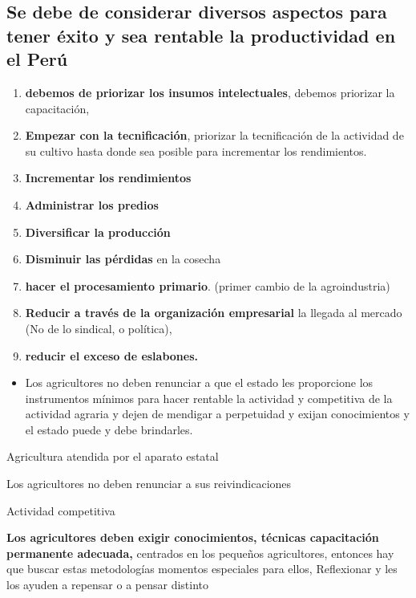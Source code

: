 \documentclass[
  letterpaper,
  DIV=11,
  numbers=noendperiod]{scrartcl}
\providecommand{\tightlist}{%
  \setlength{\itemsep}{0pt}\setlength{\parskip}{0pt}}\usepackage{longtable,booktabs,array}
\begin{document}
\hypertarget{se-debe-de-considerar-diversos-aspectos-para-tener-uxe9xito-y-sea-rentable-la-productividad-en-el-peruxfa}{%
\subsection{Se debe de considerar diversos aspectos para tener éxito y
sea rentable la productividad en el
Perú}\label{se-debe-de-considerar-diversos-aspectos-para-tener-uxe9xito-y-sea-rentable-la-productividad-en-el-peruxfa}}

\begin{enumerate}
\def\labelenumi{\arabic{enumi}.}
\item
  \textbf{debemos de priorizar los insumos intelectuales}, debemos
  priorizar la capacitación,
\item
  \textbf{Empezar con la tecnificación}, priorizar la tecnificación de
  la actividad de su cultivo hasta donde sea posible para incrementar
  los rendimientos.
\item
  \textbf{Incrementar los rendimientos}
\item
  \textbf{Administrar los predios}
\item
  \textbf{Diversificar la producción}
\item
  \textbf{Disminuir las pérdidas} en la cosecha
\item
  \textbf{hacer el procesamiento primario}. (primer cambio de la
  agroindustria)
\item
  \textbf{Reducir a través de la organización empresarial} la llegada al
  mercado (No de lo sindical, o política),
\item
  \textbf{reducir el exceso de eslabones.}
\end{enumerate}

\begin{itemize}
\tightlist
\item
  Los agricultores no deben renunciar a que el estado les proporcione
  los instrumentos mínimos para hacer rentable la actividad y
  competitiva de la actividad agraria y dejen de mendigar a perpetuidad
  y exijan conocimientos y el estado puede y debe brindarles.
\end{itemize}

Agricultura atendida por el aparato estatal

Los agricultores no deben renunciar a sus reivindicaciones

Actividad competitiva

\textbf{Los agricultores deben exigir conocimientos, técnicas
capacitación permanente adecuada,} centrados en los pequeños
agricultores, entonces hay que buscar estas metodologías momentos
especiales para ellos, Reflexionar y les los ayuden a repensar o a
pensar distinto
\end{document}
